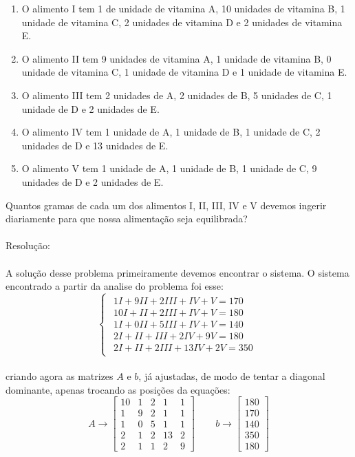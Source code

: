 \documentclass[
12pt,				%
openright,			%
twoside,			%
a4paper,			%
english,			%
french,				%
spanish,			%
brazil				%
]{abntex2_new}
\begin{document}
		\begin{enumerate}
			\item{O alimento I tem 1 de unidade de vitamina A, 10 unidades de vitamina B, 1
				unidade de vitamina C, 2 unidades 
				de vitamina D e 2 unidades de vitamina E.}
			\item{O alimento II tem 9 unidades de vitamina A, 1 unidade de vitamina B, 0
				unidade de vitamina C, 1 unidade de 
				vitamina D e 1 unidade de vitamina E.}
			\item{O alimento III tem 2 unidades de A, 2 unidades de B, 5 unidades de C, 1
				unidade de D e 2 unidades de E.}
			\item{O alimento IV tem 1 unidade de A, 1 unidade de B, 1 unidade de C, 2
				unidades de D e 13 unidades de E.}
			\item{O alimento V tem 1 unidade de A, 1 unidade de B, 1 unidade de C, 9
				unidades de D e 2 unidades de E.}
		\end{enumerate}
		Quantos gramas de cada um dos alimentos I, II, III, IV e V devemos ingerir
		diariamente para que nossa alimentação seja
		equilibrada?\\
		\\Resolução:\\
		\\
		A solução desse problema primeiramente devemos encontrar o sistema. O sistema
		encontrado a partir da analise do problema foi esse:\\
		$$\begin{cases}
		\begin{aligned}
		1I+9II+2III+IV+V=170\\
		10I+II+2III+IV+V=180\\
		1I+0II+5III+IV+V=140\\
		2I+II+III+2IV+9V=180\\
		2I+II+2III+13IV+2V=350
		\end{aligned}
		\end{cases}$$\\
		criando agora as matrizes $A$ e $b$, já ajustadas, de modo de tentar a diagonal
		dominante, apenas trocando as posições da equações:\\
		$$	A \rightarrow   \begin{bmatrix}
		10 & 1 & 2 & 1 & 1  \\
		1 & 9 & 2 & 1 & 1  \\
		1 & 0 & 5 & 1 & 1  \\
		2 & 1 & 2 & 13 & 2  \\
		2 & 1 & 1 & 2 & 9  
		\end{bmatrix} \hspace{25pt}
		b \rightarrow  \begin{bmatrix}
		180\\
		170\\
		140\\
		350\\
		180
		\end{bmatrix}
		$$\\
		
\end{document}
